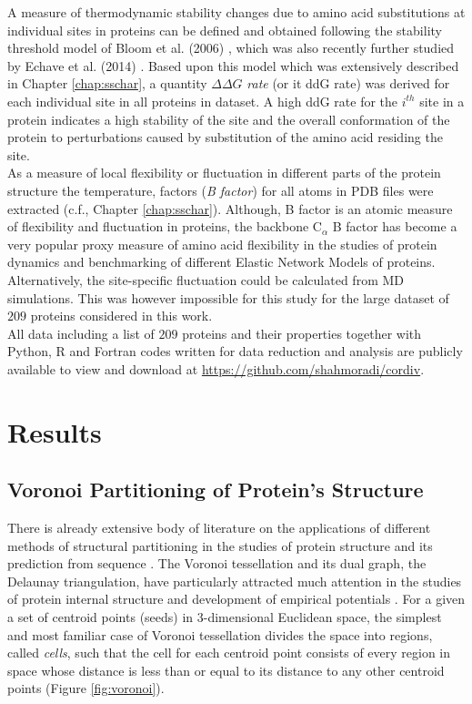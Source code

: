 \documentclass[11pt]{article}
\begin{document}
    A measure of thermodynamic stability changes due to amino acid substitutions at individual sites in proteins can be defined and obtained following the stability threshold model of Bloom et al. (2006) \cite{bloom_structural_2006}, which was also recently further studied by Echave et al. (2014) \cite{echave_relationship_2014}. Based upon this model which was extensively described in Chapter \ref{chap:sschar}, a quantity $\Delta\Delta G$ {\it rate} (or {it ddG rate}) was derived for each individual site in all proteins in dataset. A high ddG rate for the $i^{th}$ site in a protein indicates a high stability of the site and the overall conformation of the protein to perturbations caused by substitution of the amino acid residing the site. \\

    As a measure of local flexibility or fluctuation in different parts of the protein structure the temperature, factors ({\it B factor}) for all atoms in PDB files were extracted (c.f., Chapter \ref{chap:sschar}). Although, B factor is an atomic measure of flexibility and fluctuation in proteins, the backbone C$_\alpha$ B factor has become a very popular proxy measure of amino acid flexibility in the studies of protein dynamics and benchmarking of different Elastic Network Models of proteins.  Alternatively, the site-specific fluctuation could be calculated from MD simulations. This was however impossible for this study for the large dataset of $209$ proteins considered in this work. \\

    All data including a list of $209$ proteins and their properties together with Python, R and Fortran codes written for data reduction and analysis are publicly available to view and download at \url{https://github.com/shahmoradi/cordiv}.


\section{Results}

    \subsection*{Voronoi Partitioning of Protein's Structure}
    \label{sec:voro}

    There is already extensive body of literature on the applications of different methods of structural partitioning in the studies of protein structure and its prediction from sequence \cite{richards_interpretation_1974, gerstein_volume_1994}. The Voronoi tessellation and its dual graph, the Delaunay triangulation, have particularly attracted much attention in the studies of protein internal structure and development of empirical potentials \cite{zomorodian_geometric_2006, zhou_alpha_2014, xia_identifying_2014}. For a given a set of centroid points (seeds) in 3-dimensional Euclidean space, the simplest and most familiar case of Voronoi tessellation divides the space into regions, called {\it cells}, such that the cell for each centroid point consists of every region in space whose distance is less than or equal to its distance to any other centroid points (Figure \ref{fig:voronoi}). \\
\end{document}
